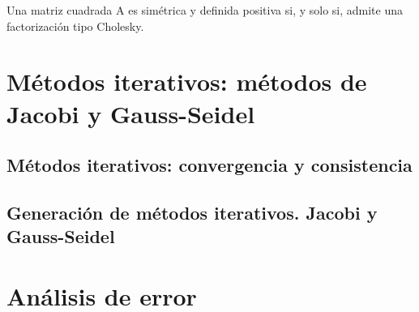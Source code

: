 			\begin{nprop}
			Una matriz cuadrada A es simétrica y definida positiva si, y solo si, admite una factorización tipo Cholesky.
			\end{nprop}
		
	\section{Métodos iterativos: métodos de Jacobi y Gauss-Seidel}
		\subsection{Métodos iterativos: convergencia y consistencia}
		\subsection{Generación de métodos iterativos. Jacobi y Gauss-Seidel}
	\section{Análisis de error}
	


